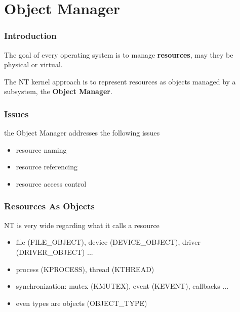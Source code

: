%
%

\section{Object Manager}


\begin{frame}
  \frametitle{Introduction}

 The goal of every operating system is to manage \textbf{resources}, may
 they be physical or virtual.

  \-

 The NT kernel approach is to represent resources as objects managed by a
 subsystem, the \textbf{Object Manager}.

\end{frame}


\begin{frame}
  \frametitle{Issues}

  the Object Manager addresses the following issues

  \begin{itemize}
    \item
      resource naming
    \item
      resource referencing
    \item
      resource access control
 \end{itemize}
\end{frame}


\begin{frame}
  \frametitle{Resources As Objects}

  NT is very wide regarding what it calls a resource

  \begin{itemize}
    \item
      file (FILE\_OBJECT), device (DEVICE\_OBJECT), driver (DRIVER\_OBJECT) ...
    \item
      process (KPROCESS), thread (KTHREAD)
    \item
      synchronization: mutex (KMUTEX), event (KEVENT), callbacks ...
    \item
      even types are objects (OBJECT\_TYPE)
  \end{itemize}

\end{frame}


